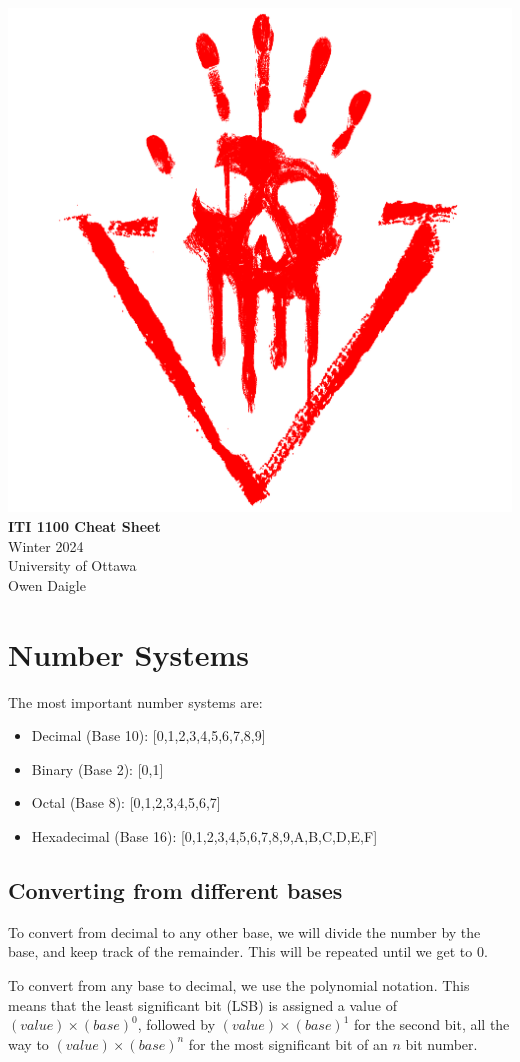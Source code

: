 \documentclass[12pt,letterpaper]{article} \usepackage{amsmath} \usepackage{graphicx}  \usepackage{longtable}  \usepackage{amssymb}
\begin{document}
    \thispagestyle{empty}
    \begin{center}
        \includegraphics[width=0.12\linewidth]{abs.png}\\
        \vspace{2em}
        \Large\textbf{ITI 1100 Cheat Sheet} \\
        \vspace{0.5em}
        \small{Winter 2024} \\
        \small{University of Ottawa} \\
        \small{Owen Daigle}
    \end{center}

    \pagebreak

    \begin{spacing}{0}
    \tableofcontents
    \end{spacing}

    \pagebreak
    

    \section{Number Systems}
    The most important number systems are:
    \begin{itemize}[noitemsep]
        \item Decimal (Base 10): [0,1,2,3,4,5,6,7,8,9]
        \item Binary (Base 2): [0,1]
        \item Octal (Base 8): [0,1,2,3,4,5,6,7]
        \item Hexadecimal (Base 16): [0,1,2,3,4,5,6,7,8,9,A,B,C,D,E,F]
    \end{itemize}

        \subsection{Converting from different bases}
        To convert from decimal to any other base, we will divide the number by the base, and keep track of the remainder. This will be repeated until we get to 0.
        
        To convert from any base to decimal, we use the polynomial notation. This means that the least significant bit (LSB) is assigned a value of $(value)\times (base)^0$, followed by $(value)\times (base)^1$ for the second bit, all the way to $(value)\times (base)^n$ for the most significant bit of an $n$ bit number. 
\end{document}
